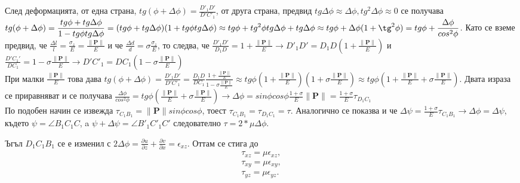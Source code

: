 \documentclass{report}
\begin{document}
	След деформацията, от една страна, $\displaystyle tg(\phi + \Delta \phi)=\frac{D'_1D'}{D'C'_1}$, от друга страна, предвид $tg \Delta \phi \approx \Delta \phi, tg^2 \Delta \phi \approx 0$
	се получава \\
	$\displaystyle tg(\phi + \Delta \phi)=\frac{tg \phi + tg \Delta \phi}{1-tg \phi tg \Delta \phi}=(tg \phi + tg \Delta \phi)(1+tg \phi tg \Delta \phi)\approx tg \phi + tg^2 \phi tg \Delta \phi + tg \Delta \phi\approx tg \phi + \Delta \phi(1 + \tg^2 \phi)=tg \phi + \frac{\Delta \phi}{cos^2 \phi}$. Като се вземе предвид, че $\displaystyle \frac{\Delta l}{l} = \frac{\sigma_z}{E} = \frac{\|\mathbf{P}\|}{E}$ и че $\displaystyle \frac{\Delta d}{d}=\sigma \frac{\sigma_z}{E}$, то следва, че 
	$\displaystyle \frac{D'_1D'}{D_1D}=1+\frac{\|\mathbf{P}\|}{E}\xrightarrow{}
	D'_1D'=D_1D(1+\frac{\|\mathbf{P}\|}{E})$ и $\frac{D'C_1'}{DC_1}=1-\sigma \frac{\|\mathbf{P}\|}{E}\xrightarrow{}
	D'C'_1=DC_1(1-\sigma \frac{\|\mathbf{P}\|}{E})$\\
	При малки $\displaystyle \frac{\|\mathbf{P}\|}{E}$ това дава $\displaystyle tg(\phi + \Delta \phi)= \frac{D'_1D'}{D'C'_1} = \frac{D_1D}{DC_1} \frac{1+ \frac{\|\mathbf{P}\|}{E}}{1-\sigma \frac{\|\mathbf{P}\|}{E}}\approx tg \phi (1+\frac{\|\mathbf{P}\|}{E})(1+\sigma\frac{\|\mathbf{P}\|}{E}) \approx tg \phi (1+\frac{\|\mathbf{P}\|}{E}+\sigma \frac{\|\mathbf{P}\|}{E})$. Двата израза се приравняват и се получава $\displaystyle \frac{\Delta \phi}{cos^2 \phi} = tg\phi (\frac{\|\mathbf{P}\|}{E}+\sigma \frac{\|\mathbf{P}\|}{E}) \xrightarrow[]{} \Delta \phi = sin \phi cos \phi \frac{1+\sigma}{E}\|\mathbf{P}\| = \frac{1+\sigma}{E}\tau_{D_1C_1}$\\
	По подобен начин се извежда $\displaystyle \tau_{C_1B_1}=\|\mathbf{P}\|sin \phi cos \phi$, тоест $\tau_{C_1B_1}=\tau_{D_1C_1}=\tau$. Аналогично се показва и че $\displaystyle \Delta \psi = \frac{1+\sigma}{E}\tau_{C_1B_1} \xrightarrow{} \Delta \phi = \Delta \psi$, където $\psi = \angle B_1C_1C$, a $\psi+\Delta \psi=\angle B'_1C'_1C'$ следователно $\tau=2*\mu \Delta \phi$.
	
	Ъгъл $D_1C_1B_1$ се е изменил с $2\displaystyle \Delta \phi=\frac{\partial u}{\partial z}+\frac{\partial v}{\partial x}=\epsilon_{xz}$. Оттам се стига до
	\begin{align}
		\tau_{xz}=\mu\epsilon_{xz},\label{eq:relation4}\\
		\tau_{xy}=\mu\epsilon_{xy},\label{eq:relation5}\\
		\tau_{yz}=\mu\epsilon_{yz}.\label{eq:relation6}
	\end{align}
	
\end{document}
